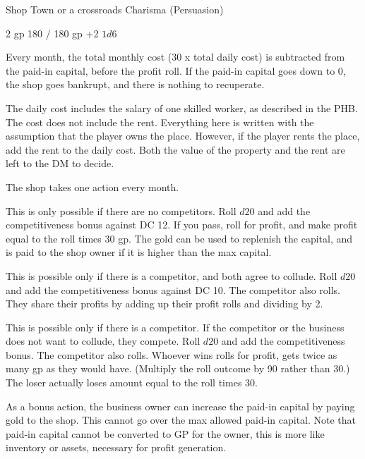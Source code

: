 \documentclass[twocolumn]{dndbook}
\begin{document}
\begin{DndMonster}[width=.5\textwidth - 8pt]{Shop}
	\hfill Town or a crossroads
	\hfill Charisma (Persuasion)

	\hfill 2 gp
	\hfill 180 / 180 gp
	\hfill +2
	\hfill $ 1d6 $

	Every month, the total monthly cost (30 x total daily cost) is subtracted
	from the paid-in capital, before the profit roll.
	If the paid-in capital goes down to 0, the shop goes bankrupt,
	and there is nothing to recuperate.\par

	The daily cost includes the salary of one skilled worker, as described in the PHB.
	The cost does not include the rent.
	Everything here is written with the assumption that the player owns the place.
	However, if the player rents the place, add the rent to the daily cost.
	Both the value of the property and the rent are left to the DM to decide.\par

	The shop takes one action every month.

	This is only possible if there are no competitors.
	Roll $d20$ and add the competitiveness bonus against DC 12.
	If you pass, roll for profit, and make profit equal to the roll
	times 30 gp. The gold can be used to replenish the capital,
	and is paid to the shop owner if it is higher than the max capital.

	This is possible only if there is a competitor, and both agree to collude.
	Roll $d20$ and add the competitiveness bonus against DC 10.
	The competitor also rolls. They share their profits by adding up
	their profit rolls and dividing by 2.

	This is possible only if there is a competitor. If the competitor
	or the business does not want to collude, they compete.
	Roll $d20$ and add the competitiveness bonus.
	The competitor also rolls.
	Whoever wins rolls for profit, gets twice as many gp as they would have.
	(Multiply the roll outcome by 90 rather than 30.)
	The loser actually loses amount equal to the roll times 30.

	As a bonus action, the business owner can increase
	the paid-in capital by paying gold to the shop.
	This cannot go over the max allowed paid-in capital.
	Note that paid-in capital cannot be converted to GP for the owner,
	this is more like inventory or assets, necessary for profit generation.


\end{DndMonster}
\end{document}

